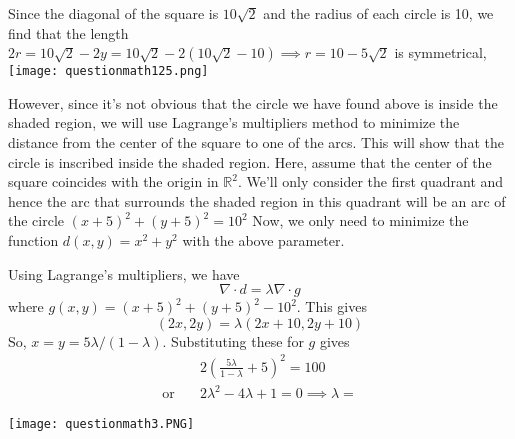 

    
    \begin{questions}

        

        \begin{solution}
                Since the diagonal of the square is $10\sqrt{2}$ and
            the radius of each circle is 10, we find that the length
            $2r=10\sqrt{2}-2y= 10\sqrt{2}-2(10\sqrt{2}-10) \implies
            r=10-5\sqrt{2}$ is symmetrical,
            \texttt{[image: questionmath125.png]}

            \begin{minipage}{.69\textwidth}
                However, since it's not obvious that the circle we
                have found above is inside the shaded region, we will
                use Lagrange's multipliers method to minimize the distance
                from the center of the square to one of the arcs. This
                will show that the circle is inscribed inside the shaded
                region.
                Here, assume that the center of the square coincides
                with the origin in $\mathbb{R}^2$.
                We'll only consider the first quadrant and hence the arc
                that surrounds the shaded region in this quadrant
                will be an arc of the circle
                $(x+5)^2+(y+5)^2 =10^2$
                Now, we only need to minimize the function
                $d(x,y)=x^2+y^2$ with the above parameter.

                Using Lagrange's multipliers, we have
                $$\nabla\cdot d = \lambda\nabla\cdot g$$
                where $g(x,y)=(x+5)^2+(y+5)^2 -10^2$.
                This gives
                $$(2x,2y)=\lambda(2x+10,2y+10)$$
                So, $x=y=5\lambda/(1-\lambda)$. Substituting these for
                $g$ gives
                \begin{align*}
                    &2\left(\frac{5\lambda}{1-\lambda}+5\right)^2=100\\
                    \text{or}\quad&2\lambda^2-4\lambda+1=0
                    \implies \lambda = 
                \end{align*}
            \end{minipage}
            \begin{minipage}{.3\textwidth}
                \begin{flushright}
                    \texttt{[image: questionmath3.PNG]}
                \end{flushright}
            \end{minipage}
            


\end{solution}
\end{questions}
